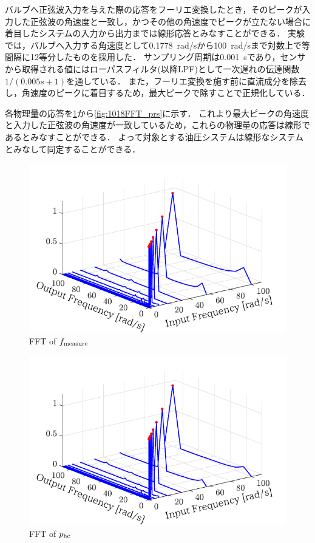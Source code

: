 バルブへ正弦波入力を与えた際の応答をフーリエ変換したとき，そのピークが入力した正弦波の角速度と一致し，かつその他の角速度でピークが立たない場合に着目したシステムの入力から出力までは線形応答とみなすことができる．
実験では，バルブへ入力する角速度として\SI{0.1778}{rad/s}から\SI{100}{rad/s}まで対数上で等間隔に12等分したものを採用した．
サンプリング周期は\SI{0.001}{s}であり，センサから取得される値にはローパスフィルタ(以降LPF)として一次遅れの伝達関数${1}/(0.005s+1)$を通している．
また，フーリエ変換を施す前に直流成分を除去し，角速度のピークに着目するため，最大ピークで除すことで正規化している．

各物理量の応答を\figname\ref{fig:1018FFT_fmeasure}から\figname\ref{fig:1018FFT_prs}に示す．
これより最大ピークの角速度と入力した正弦波の角速度が一致しているため，これらの物理量の応答は線形であるとみなすことができる．
よって対象とする油圧システムは線形なシステムとみなして同定することができる．
\begin{figure}[t]
    \centering
        \includegraphics[keepaspectratio, scale=1.0]{contents/SystemIdentification/figure/1018FFT_fmeasure.pdf}
        \caption{FFT of $f_\mathrm{measure}$}
        \label{fig:1018FFT_fmeasure}
\end{figure}
\begin{figure}[t]
    \centering
        \includegraphics[keepaspectratio, scale=1.0]{contents/SystemIdentification/figure/1018FFT_phs.pdf}
        \caption{FFT of $p_\mathrm{hc}$}
        \label{fig:1018FFT_phs}
\end{figure}
